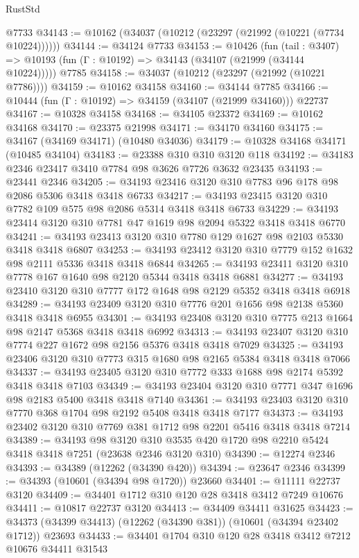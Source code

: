 \begin{lexlean}{RustStd}
\begin{coremodule}
    @7733
@34143 := @10162 (@34037 (@10212 (@23297 (@21992 (@10221 (@7734 @10224))))))
@34144 := @34124 @7733
@34153 := @10426
    (fun (tail : @3407) => @10193 (fun (Γ : @10192) => @34143 (@34107 (@21999 (@34144 @10224)))))
    @7785
@34158 := @34037 (@10212 (@23297 (@21992 (@10221 @7786))))
@34159 := @10162 @34158
@34160 := @34144 @7785
@34166 := @10444 (fun (Γ : @10192) => @34159 (@34107 (@21999 @34160))) @22737
@34167 := @10328 @34158
@34168 := @34105 @23372
@34169 := @10162 @34168
@34170 := @23375 @21998
@34171 := @34170 @34160
@34175 := @34167 (@34169 @34171) (@10480 @34036)
@34179 := @10328 @34168 @34171 (@10485 @34104)
@34183 := @23388 @310 @310 @3120 @118
@34192 := @34183 @2346 @23417 @3410 @7784 @98 @3626 @7726 @3632 @23435
@34193 := @23441 @2346
@34205 := @34193 @23416 @3120 @310 @7783 @96 @178 @98 @2086 @5306 @3418 @3418 @6733
@34217 := @34193 @23415 @3120 @310 @7782 @109 @575 @98 @2086 @5314 @3418 @3418 @6733
@34229 := @34193 @23414 @3120 @310 @7781 @47 @1619 @98 @2094 @5322 @3418 @3418 @6770
@34241 := @34193 @23413 @3120 @310 @7780 @129 @1627 @98 @2103 @5330 @3418 @3418 @6807
@34253 := @34193 @23412 @3120 @310 @7779 @152 @1632 @98 @2111 @5336 @3418 @3418 @6844
@34265 := @34193 @23411 @3120 @310 @7778 @167 @1640 @98 @2120 @5344 @3418 @3418 @6881
@34277 := @34193 @23410 @3120 @310 @7777 @172 @1648 @98 @2129 @5352 @3418 @3418 @6918
@34289 := @34193 @23409 @3120 @310 @7776 @201 @1656 @98 @2138 @5360 @3418 @3418 @6955
@34301 := @34193 @23408 @3120 @310 @7775 @213 @1664 @98 @2147 @5368 @3418 @3418 @6992
@34313 := @34193 @23407 @3120 @310 @7774 @227 @1672 @98 @2156 @5376 @3418 @3418 @7029
@34325 := @34193 @23406 @3120 @310 @7773 @315 @1680 @98 @2165 @5384 @3418 @3418 @7066
@34337 := @34193 @23405 @3120 @310 @7772 @333 @1688 @98 @2174 @5392 @3418 @3418 @7103
@34349 := @34193 @23404 @3120 @310 @7771 @347 @1696 @98 @2183 @5400 @3418 @3418 @7140
@34361 := @34193 @23403 @3120 @310 @7770 @368 @1704 @98 @2192 @5408 @3418 @3418 @7177
@34373 := @34193 @23402 @3120 @310 @7769 @381 @1712 @98 @2201 @5416 @3418 @3418 @7214
@34389 := @34193
    @98
    @3120
    @310
    @3535
    @420
    @1720
    @98
    @2210
    @5424
    @3418
    @3418
    @7251
    (@23638 @2346 @3120 @310)
@34390 := @12274 @2346
@34393 := @34389 (@12262 (@34390 @420))
@34394 := @23647 @2346
@34399 := @34393 (@10601 (@34394 @98 @1720)) @23660
@34401 := @11111 @22737 @3120
@34409 := @34401 @1712 @310 @120 @28 @3418 @3412 @7249 @10676
@34411 := @10817 @22737 @3120
@34413 := @34409 @34411 @31625
@34423 := @34373 (@34399 @34413) (@12262 (@34390 @381)) (@10601 (@34394 @23402 @1712)) @23693
@34433 := @34401 @1704 @310 @120 @28 @3418 @3412 @7212 @10676 @34411 @31543

\end{coremodule}
\end{lexlean}
